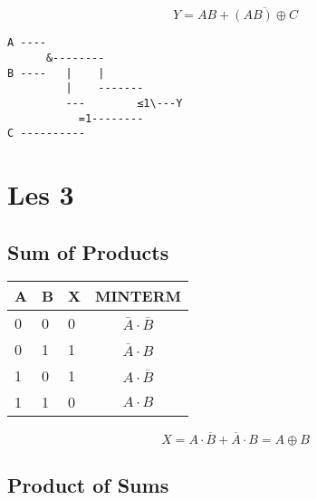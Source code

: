 \documentclass[11pt, a4paper]{article}
\begin{document}


$$Y=AB+\overline{(AB) \oplus C}$$

\begin{verbatim}
A ----
      &--------
B ----   |    |
         |    -------
         ---        ≤1\---Y
           =1--------
C ----------
\end{verbatim}

\newpage

\section{Les 3}

\subsection{Sum of Products}

\begin{tabular}{l l l || c}
A & B & X  & MINTERM \\
\hline
0 & 0 & 0  & $\overline{A}\cdot \overline{B}$ \\
0 & 1 & 1  & $\overline{A}\cdot B$ \\
1 & 0 & 1  & $A\cdot \overline{B}$ \\
1 & 1 & 0  & $A\cdot B$ \\
\end{tabular}


$$X = A\cdot \overline{B} + \overline{A}\cdot B = A  \oplus  B$$


\subsection{Product of Sums}
\end{document}
